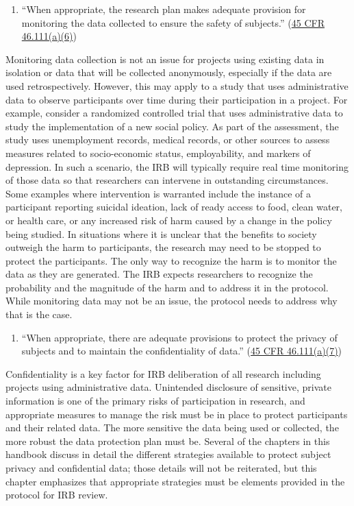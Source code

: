 \documentclass[
]{book}
\providecommand{\tightlist}{%
  \setlength{\itemsep}{0pt}\setlength{\parskip}{0pt}}
\begin{document}
\begin{enumerate}
\def\labelenumi{(\arabic{enumi})}
\setcounter{enumi}{5}
\tightlist
\item
  ``When appropriate, the research plan makes adequate provision for monitoring the data collected to ensure the safety of subjects.'' (\href{https://www.law.cornell.edu/cfr/text/45/46.111}{45 CFR 46.111(a)(6)})
\end{enumerate}

Monitoring data collection is not an issue for projects using existing data in isolation or data that will be collected anonymously, especially if the data are used retrospectively. However, this may apply to a study that uses administrative data to observe participants over time during their participation in a project. For example, consider a randomized controlled trial that uses administrative data to study the implementation of a new social policy. As part of the assessment, the study uses unemployment records, medical records, or other sources to assess measures related to socio-economic status, employability, and markers of depression. In such a scenario, the IRB will typically require real time monitoring of those data so that researchers can intervene in outstanding circumstances. Some examples where intervention is warranted include the instance of a participant reporting suicidal ideation, lack of ready access to food, clean water, or health care, or any increased risk of harm caused by a change in the policy being studied. In situations where it is unclear that the benefits to society outweigh the harm to participants, the research may need to be stopped to protect the participants. The only way to recognize the harm is to monitor the data as they are generated. The IRB expects researchers to recognize the probability and the magnitude of the harm and to address it in the protocol. While monitoring data may not be an issue, the protocol needs to address why that is the case.

\begin{enumerate}
\def\labelenumi{(\arabic{enumi})}
\setcounter{enumi}{6}
\tightlist
\item
  ``When appropriate, there are adequate provisions to protect the privacy of subjects and to maintain the confidentiality of data.'' (\href{https://www.law.cornell.edu/cfr/text/45/46.111}{45 CFR 46.111(a)(7)})
\end{enumerate}

Confidentiality is a key factor for IRB deliberation of all research including projects using administrative data. Unintended disclosure of sensitive, private information is one of the primary risks of participation in research, and appropriate measures to manage the risk must be in place to protect participants and their related data. The more sensitive the data being used or collected, the more robust the data protection plan must be. Several of the chapters in this handbook discuss in detail the different strategies available to protect subject privacy and confidential data; those details will not be reiterated, but this chapter emphasizes that appropriate strategies must be elements provided in the protocol for IRB review.
\end{document}
